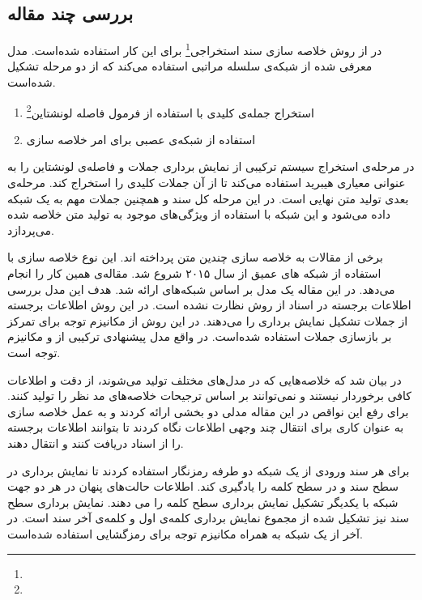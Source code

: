 \documentclass[12pt, a4paper, oneside]{report}
\begin{document}
\subsection{بررسی چند مقاله}

در
\cite{zhang2018extractive}
از روش
خلاصه سازی سند استخراجی\footnote{}
برای این کار استفاده ‌شده‌است. مدل معرفی شده از شبکه‌ی
سلسله مراتبی استفاده می‌کند که از دو مرحله تشکیل شده‌است.

\begin{enumerate}
    \item استخراج جمله‌ی کلیدی با استفاده از فرمول فاصله لونشتاین\footnote{}
    \item استفاده از شبکه‌ی عصبی برای امر خلاصه سازی
\end{enumerate}

در مرحله‌ی استخراج سیستم ترکیبی از نمایش برداری جملات و فاصله‌ی لونشتاین را به عنوانی معیاری
هیبرید استفاده می‌کند تا از آن جملات کلیدی را استخراج کند.
مرحله‌ی بعدی تولید متن نهایی است. در این مرحله کل سند و همچنین جملات مهم به یک شبکه
داده می‌شود و این شبکه با استفاده از ویژگی‌های موجود به تولید متن خلاصه شده می‌پردازد.

برخی از مقالات به خلاصه سازی چندین متن پرداخته اند. این نوع خلاصه سازی
با استفاده از شبکه های عمیق از سال ۲۰۱۵ شروع شد. مقاله‌ی
\cite{li2017cascaded}
همین کار را انجام می‌دهد. در این مقاله یک مدل بر اساس شبکه‌های
ارائه شد. هدف این مدل بررسی اطلاعات برجسته در اسناد از روش نظارت نشده است. 
در این روش اطلاعات برجسته از جملات تشکیل نمایش برداری را می‌دهند.
در این روش از مکانیزم توجه برای تمرکز بر بازسازی جملات استفاده شده‌است.
در واقع مدل پیشنهادی ترکیبی از
و
مکانیزم ‌توجه است.

در
\cite{amplayo2021informative}
بیان شد که خلاصه‌هایی که در مدل‌های مختلف تولید می‌شوند، از دقت و اطلاعات کافی برخوردار نیستند و نمی‌توانند
بر اساس ترجیحات خلاصه‌های مد نظر را تولید کنند. برای رفع این نواقص در این مقاله مدلی دو بخشی ارائه کردند و
به عمل خلاصه سازی به عنوان کاری برای انتقال چند وجهی اطلاعات نگاه کردند تا بتوانند اطلاعات برجسته
را از اسناد دریافت کنند و انتقال دهند.

برای هر سند ورودی از یک شبکه
دو طرفه رمزنگار استفاده کردند تا نمایش برداری در سطح سند و در سطح کلمه را یادگیری کند.
اطلاعات حالت‌های پنهان در هر دو جهت شبکه با یکدیگر تشکیل نمایش برداری سطح کلمه را می دهند.
نمایش برداری سطح سند نیز تشکیل شده از مجموع نمایش برداری کلمه‌ی اول و کلمه‌ی آخر سند است.
در آخر از یک شبکه
به همراه مکانیزم توجه برای رمزگشایی استفاده شده‌است.
\end{document}
